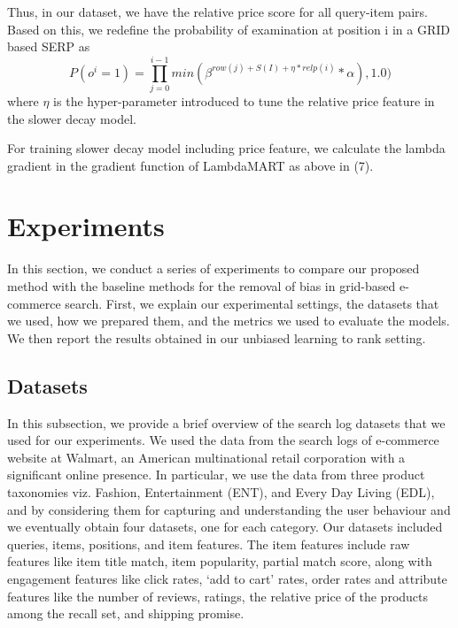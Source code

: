 \documentclass[11pt]{article}
\begin{document}
Thus, in our dataset, we have the relative price score for all query-item pairs. Based on this, we redefine the probability of examination at position i in a GRID based SERP as 
\begin{equation}
P(o^i = 1) = \prod_{j=0}^{i-1} min( \beta^{row(j) +S(I) + \eta * relp(i)} * \alpha ), 1.0)
\end{equation}
\newline
where $\eta$ is the hyper-parameter introduced to tune the relative price feature in the slower decay model. 

For training slower decay model including price feature, we calculate the lambda gradient in the gradient function of LambdaMART as above in (7). 

\section{Experiments}

In this section, we conduct a series of experiments to compare our proposed method with the baseline methods for the removal of bias in grid-based e-commerce search. First, we explain our experimental settings, the datasets that we used, how we prepared them, and the metrics we used to evaluate the models. We then report the results obtained in our unbiased learning to rank setting.  

\subsection{Datasets}  
In this subsection, we provide a brief overview of the search log datasets that we used for our experiments. We used the data from the search logs of e-commerce website at Walmart, an American multinational retail corporation with a significant online presence. In particular, we use the data from three product taxonomies viz. Fashion, Entertainment (ENT), and Every Day Living (EDL), and by considering them for capturing and understanding the user behaviour and we eventually obtain four datasets, one for each category. Our datasets included queries, items, positions, and item features. The item features include raw features like item title match, item popularity, partial match score, along with engagement features like click rates, ‘add to cart’ rates, order rates and attribute features like the number of reviews, ratings, the relative price of the products among the recall set, and shipping promise.  
\end{document}
